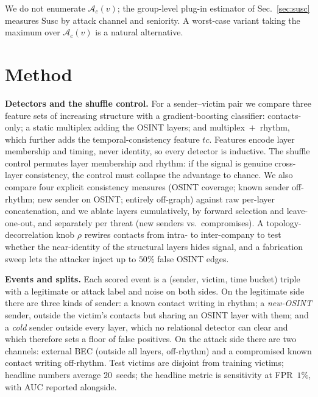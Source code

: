 \documentclass[conference]{IEEEtran}
\begin{document}
\noindent We do not enumerate $\mathcal{A}_c(v)$; the group-level plug-in estimator of Sec.~\ref{sec:susc}
measures $\mathrm{Susc}$ by attack channel and seniority. A worst-case variant taking the maximum over
$\mathcal{A}_c(v)$ is a natural alternative.

\section{Method}
\label{sec:method}
\textbf{Detectors and the shuffle control.} For a sender--victim pair we compare three feature sets of
increasing structure with a gradient-boosting classifier: contacts-only; a static multiplex adding the OSINT
layers; and multiplex~$+$~rhythm, which further adds the temporal-consistency feature $tc$. Features encode
layer membership and timing, never identity, so every detector is inductive. The shuffle control permutes layer
membership and rhythm: if the signal is genuine cross-layer consistency, the control must collapse the
advantage to chance. We also compare four explicit consistency measures (OSINT coverage; known sender
off-rhythm; new sender on OSINT; entirely off-graph) against raw per-layer concatenation, and we ablate layers
cumulatively, by forward selection and leave-one-out, and separately per threat (new senders vs.\
compromises). A topology-decorrelation knob $\rho$ rewires contacts from intra- to inter-company to test whether
the near-identity of the structural layers hides signal, and a fabrication sweep lets the attacker inject up to
$50\%$ false OSINT edges.

\textbf{Events and splits.} Each scored event is a (sender, victim, time bucket) triple with a legitimate or
attack label and noise on both sides. On the legitimate side there are three kinds of sender: a known
contact writing in rhythm; a \emph{new-OSINT} sender, outside the victim's contacts but sharing an OSINT
layer with them; and a \emph{cold} sender outside every layer, which no relational detector can clear and
which therefore sets a floor of false positives. On the attack side there are two channels: external BEC
(outside all layers, off-rhythm) and a compromised known contact writing off-rhythm. Test victims are
disjoint from training victims; headline numbers average $20$~seeds; the headline metric is sensitivity at
FPR~$1\%$, with AUC reported alongside.
\end{document}
